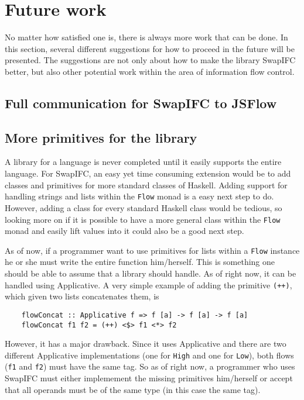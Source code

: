 \chapter{Future work}
No matter how satisfied one is, there is always more work that can be done. In this section, several different suggestions for how to proceed in the future will be presented. The suggestions are not only about how to make the library SwapIFC better, but also other potential work within the area of information flow control.

\section{Full communication for SwapIFC to JSFlow}

\section{More primitives for the library}
A library for a language is never completed until it easily supports the entire language. For SwapIFC, an easy yet time consuming extension would be to add classes and primitives for more standard classes of Haskell. Adding support for handling strings and lists within the {\tt Flow} monad is a easy next step to do. However, adding a class for every standard Haskell class would be tedious, so looking more on if it is possible to have a more general class within the {\tt Flow} monad and easily lift values into it could also be a good next step.

As of now, if a programmer want to use primitives for lists within a {\tt Flow} instance he or she must write the entire function him/herself. This is something one should be able to assume that a library should handle. As of right now, it can be handled using Applicative. A very simple example of adding the primitive {\tt (++)}, which given two lists concatenates them, is
\begin{verbatim}
    flowConcat :: Applicative f => f [a] -> f [a] -> f [a]
    flowConcat f1 f2 = (++) <$> f1 <*> f2
\end{verbatim}
However, it has a major drawback. Since it uses Applicative and there are two different Applicative implementations (one for {\tt High} and one for {\tt Low}), both flows ({\tt f1} and {\tt f2}) must have the same tag. So as of right now, a programmer who uses SwapIFC must either implemement the missing primitives him/herself or accept that all operands must be of the same type (in this case the same tag).

